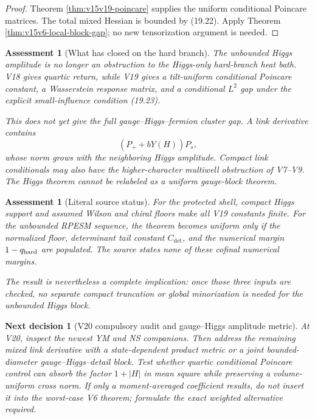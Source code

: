 \documentclass[11pt]{article}
\newtheorem{decision}[theorem]{Next decision}
\newtheorem{assessment}[theorem]{Assessment}
\theoremstyle{remark}
\begin{document}
\begin{proof}
Theorem \ref{thm:v15v19-poincare} supplies the uniform conditional
Poincare matrices.  The total mixed Hessian is bounded by
(19.22).  Apply Theorem \ref{thm:v15v6-local-block-gap}; no new
tensorization argument is needed.
\end{proof}

\begin{assessment}[What has closed on the hard branch]
\label{ass:v15v19-closed}
The unbounded Higgs amplitude is no longer an obstruction to the
Higgs-only hard-branch heat bath.  V18 gives quartic return, while
V19 gives a tilt-uniform conditional Poincare constant, a
Wasserstein response matrix, and a conditional \(L^2\) gap under
the explicit small-influence condition (19.23).

This does not yet give the full gauge--Higgs--fermion cluster gap.
A link derivative contains
\[
 (P_++bY(H))P_s,
\]
whose norm grows with the neighboring Higgs amplitude.  Compact
link conditionals may also have the higher-character multiwell
obstruction of V7--V9.  The Higgs theorem cannot be relabeled as a
uniform gauge-block theorem.
\end{assessment}

\begin{assessment}[Literal source status]
\label{ass:v15v19-source}
For the protected shell, compact Higgs support and assumed Wilson
and chiral floors make all V19 constants finite.  For the unbounded
RPESM sequence, the theorem becomes uniform only if the normalized
floor, determinant tail constant \(C_{\det}\), and the numerical
margin \(1-q_{\rm hard}\) are populated.  The source states none of
these cofinal numerical margins.

The result is nevertheless a complete implication: once those
three inputs are checked, no separate compact truncation or
global minorization is needed for the unbounded Higgs block.
\end{assessment}

\begin{decision}[V20 compulsory audit and gauge--Higgs amplitude metric]
\label{dec:v15v19-next}
At V20, inspect the newest YM and NS companions.  Then address the
remaining mixed link derivative with a state-dependent product
metric or a joint bounded-diameter gauge--Higgs--detail block.
Test whether quartic conditional Poincare control can absorb the
factor \(1+|H|\) in mean square while preserving a volume-uniform
cross norm.  If only a moment-averaged coefficient results, do not
insert it into the worst-case V6 theorem; formulate the exact
weighted alternative required.
\end{decision}
\end{document}
